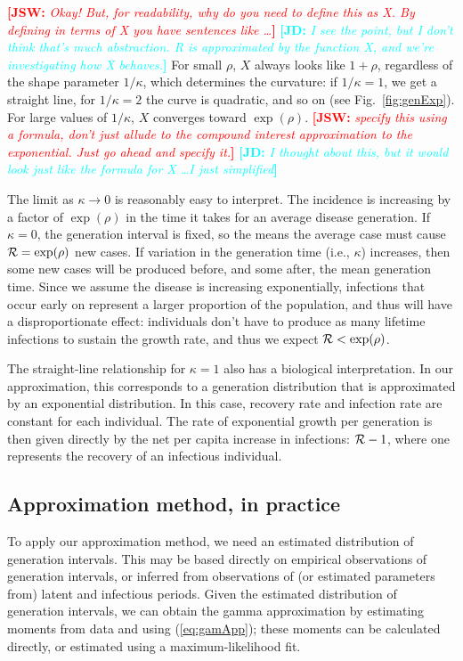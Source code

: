 \documentclass[12pt]{article}
\newcommand{\RR}{\ensuremath{{\cal R}}}
\newcommand{\eref}[1]{(\ref{eq:#1})}
\newcommand{\fref}[1]{Fig.~\ref{fig:#1}}
\newcommand{\comment}[3]{\textcolor{#1}{\textbf{[#2: }\textit{#3}\textbf{]}}}
\newcommand{\jd}[1]{\comment{cyan}{JD}{#1}}
\newcommand{\jsw}[1]{\comment{red}{JSW}{#1}}
\begin{document}
\jsw{Okay!  But, for readability, why do you need to define this as X.  By defining in terms of X you have sentences like \ldots}
\jd{I see the point, but I don't think that's much abstraction. R is approximated by the function X, and we're investigating how X behaves.}
For small $\rho$, $X$ always looks like $1+\rho$, regardless of the shape parameter $1/\kappa$, which determines the curvature: if $1/\kappa = 1$, we get a straight line, for $1/\kappa=2$ the curve is quadratic, and so on (see \fref{genExp}).
For large values of $1/\kappa$, $X$ converges toward $\exp(\rho)$.
\jsw{specify this using a formula, don't just allude to the compound interest approximation to the exponential. Just go ahead and specify it.}
\jd{I thought about this, but it would look just like the formula for X \ldots I just simplified}

The limit as $\kappa\to 0$ is reasonably easy to interpret. The incidence is increasing by a factor of $\exp(\rho)$ in the time it takes for an average disease generation. If $\kappa=0$, the generation interval is fixed, so the means the average case must cause $\RR = \exp(\rho)$ new cases.
If variation in the generation time (i.e., $\kappa$) increases, then some new cases will be produced before, and some after, the mean generation time.
Since we assume the disease is increasing exponentially, infections that occur early on represent a larger proportion of the population, and thus will have a disproportionate effect: individuals don't have to produce as many lifetime infections to sustain the growth rate, and thus we expect  $\RR < \exp(\rho)$.

The straight-line relationship for $\kappa=1$ also has a biological interpretation. 
In our approximation, this corresponds to a generation distribution that is approximated by an exponential distribution. 
In this case, recovery rate and infection rate are constant for each individual.
The rate of exponential growth per generation is then given directly by the net per capita increase in infections: $\RR-1$, where one represents the recovery of an infectious individual.

\subsection{Approximation method, in practice}

To apply our approximation method, we need an estimated distribution of generation intervals. 
This may be based directly on empirical observations of generation intervals, or inferred from observations of (or estimated parameters from) latent and infectious periods. 
Given the estimated distribution of generation intervals, we can obtain the gamma approximation by estimating moments from data and using \eref{gamApp}; these moments can be calculated directly, or estimated using a maximum-likelihood fit.
\end{document}
